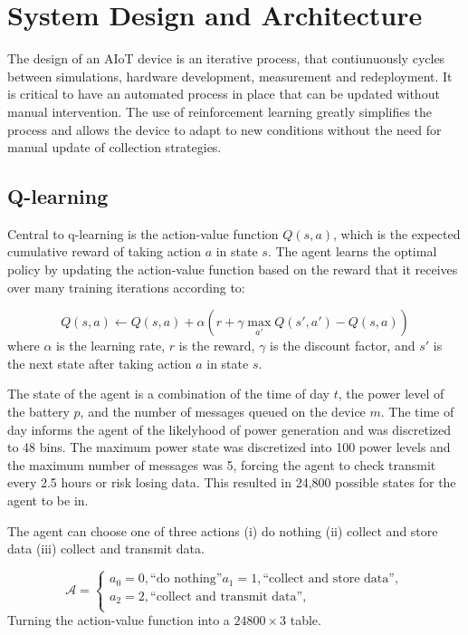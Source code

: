 \documentclass[10pt]{cai}
\begin{document}
\section{System Design and Architecture}

The design of an AIoT device is an iterative process, that contiunuously cycles between simulations, hardware development, measurement and redeployment.
It is critical to have an automated process in place that can be updated without manual intervention.
The use of reinforcement learning greatly simplifies the process and allows the device to adapt to new conditions without the need for manual update of collection strategies.

\subsection{Q-learning}

Central to q-learning is the action-value function $Q(s,a)$, which is the expected cumulative reward of taking action $a$ in state $s$.
The agent learns the optimal policy by updating the action-value function based on the reward that it receives over many training iterations according to:

\begin{equation}
  Q(s,a) \leftarrow Q(s,a) + \alpha \left( r + \gamma \max_{a'} Q(s',a') - Q(s,a) \right)
\end{equation}
where $\alpha$ is the learning rate, $r$ is the reward, $\gamma$ is the discount factor, and $s'$ is the next state after taking action $a$ in state $s$.

The state of the agent is a combination of the time of day $t$, the power level of the battery $p$, and the number of messages queued on the device $m$.
The time of day informs the agent of the likelyhood of power generation and was discretized to 48 bins.
The maximum power state was discretized into 100 power levels and the maximum number of messages was 5, forcing the agent to check transmit every 2.5 hours or risk losing data.
This resulted in 24,800 possible states for the agent to be in.

The agent can choose one of three actions (i) do nothing (ii) collect and store data (iii) collect and transmit data.

\begin{equation}
  \mathcal{A} = \left\{
  \begin{array}{l}
    a_0 = 0, \text{``do nothing''}
    a_1 = 1, \text{``collect and store data''}, \\
    a_2 = 2, \text{``collect and transmit data''}, \\
  \end{array}
  \right.
  \end{equation}
Turning the action-value function into a $24800 \times 3$ table.
  
\end{document}
